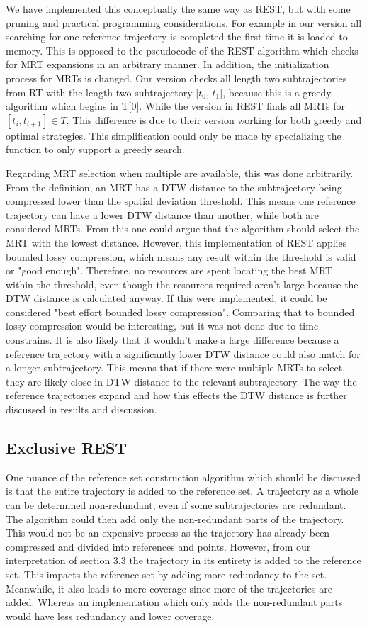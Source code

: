 We have implemented this conceptually the same way as REST, but with some pruning and practical programming considerations. For example in our version all searching for one reference trajectory is completed the first time it is loaded to memory. This is opposed to the pseudocode of the REST algorithm which checks for MRT expansions in an arbitrary manner. In addition, the initialization process for MRTs is changed. Our version checks all length two subtrajectories from RT with the length two subtrajectory [$t_0$, $t_1$], because this is a greedy algorithm which begins in T[0]. While the version in REST finds all MRTs for $[t_i, t_{i+1}] \in T$. This difference is due to their version working for both greedy and optimal strategies. This simplification could only be made by specializing the function to only support a greedy search.

Regarding MRT selection when multiple are available, this was done arbitrarily. From the definition, an MRT has a DTW distance to the subtrajectory being compressed lower than the spatial deviation threshold. This means one reference trajectory can have a lower DTW distance than another, while both are considered MRTs. From this one could argue that the algorithm should select the MRT with the lowest distance. However, this implementation of REST applies bounded lossy compression, which means any result within the threshold is valid or "good enough". Therefore, no resources are spent locating the best MRT within the threshold, even though the resources required aren't large because the DTW distance is calculated anyway. If this were implemented, it could be considered "best effort bounded lossy compression". Comparing that to bounded lossy compression would be interesting, but it was not done due to time constrains. It is also likely that it wouldn't make a large difference because a reference trajectory with a significantly lower DTW distance could also match for a longer subtrajectory. This means that if there were multiple MRTs to select, they are likely close in DTW distance to the relevant subtrajectory. The way the reference trajectories expand and how this effects the DTW distance is further discussed in results and discussion. %

\subsection{Exclusive REST}
One nuance of the reference set construction algorithm which should be discussed is that the entire trajectory is added to the reference set. A trajectory as a whole can be determined non-redundant, even if some subtrajectories are redundant. The algorithm could then add only the non-redundant parts of the trajectory. This would not be an expensive process as the trajectory has already been compressed and divided into references and points. However, from our interpretation of \cite{zhao2018rest} section 3.3 the trajectory in its entirety is added to the reference set. This impacts the reference set by adding more redundancy to the set. Meanwhile, it also leads to more coverage since more of the trajectories are added. Whereas an implementation which only adds the non-redundant parts would have less redundancy and lower coverage.

